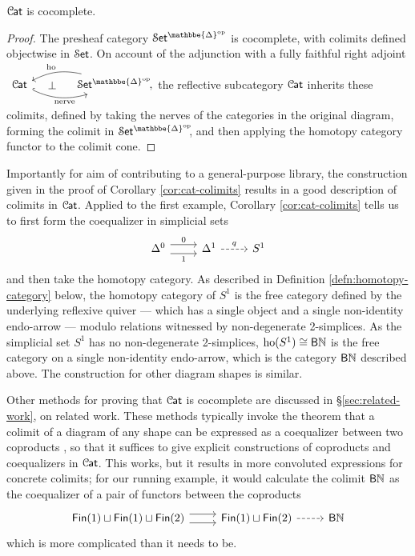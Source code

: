 \documentclass[a4paper,UKenglish,cleveref, autoref, thm-restate]{lipics-v2021}
\newcommand{\op}{\textup{op}}
\newcommand{\ho}{\textup{ho}}
\newcommand{\nerve}{\textup{nerve}}
\newcommand{\cat}[1]{\textup{\textsf{#1}}}%
\newcommand{\NN}{\mathbb{N}}
\newcommand{\1}{\mathbbe{1}}
\newcommand{\2}{\mathbbe{2}}
\newcommand{\3}{\mathbbe{3}}
\newcommand{\DDelta}{\mathbbe{\Delta}}
\newcommand{\Fin}{\cat{Fin}}
\newcommand{\Cat}{\mathcal{C}{\kern-.75pt}\cat{at}}
\newcommand{\Set}{\mathcal{S}\cat{et}}
\newcommand{\cdoc}[2][]{\href{https://leanprover-community.github.io/mathlib4_docs/find/?pattern=CategoryTheory.#1#2\#doc}{\texttt{#2}}}
\begin{document}
\begin{corollary}[\cdoc{Cat.instHasColimits}]\label{cor:cat-colimits} $\Cat$ is cocomplete.
\end{corollary}
\begin{proof}
The presheaf category $\Set^{\DDelta^\op}$ is cocomplete, with colimits defined objectwise in $\Set$. On account of the adjunction with a fully faithful right adjoint
$ \begin{tikzcd}[column sep=large] \Cat \arrow[r, bend right=20, hook, "{\nerve}"' pos=.6] \arrow[r, phantom, "\bot"] & \Set^{\DDelta^\op}\! ,\!\! \arrow[l, bend right=20, "{\ho}"' pos=.45]
\end{tikzcd}$  the reflective subcategory $\Cat$ inherits these colimits, defined by taking the nerves of the categories in the original diagram, forming the colimit in $\Set^{\DDelta^\op}\!\!$, and then applying the homotopy category functor to the colimit cone.
\end{proof}

Importantly for aim of contributing to a general-purpose library, the construction given in the proof of Corollary \ref{cor:cat-colimits} results in a good description of colimits in $\Cat$. Applied to the first example, Corollary \ref{cor:cat-colimits} tells us to first form the coequalizer in simplicial sets
\[ \begin{tikzcd} \Delta^0 \arrow[r, shift left=.4em, "0"] \arrow[r, shift right=.4em, "1"'] & \Delta^1 \arrow[r, dashed, "q"] & S^1 \end{tikzcd}\] and then take the homotopy category. As described in Definition \ref{defn:homotopy-category} below, the homotopy category of $S^1$ is the free category defined by the underlying reflexive quiver --- which has a single object and a single non-identity endo-arrow --- modulo relations witnessed by non-degenerate 2-simplices. As the simplicial set $S^1$ has no non-degenerate 2-simplices, $\ho(S^1) \cong \cat{B}\NN$ is the free category on a single non-identity endo-arrow, which is the category $\cat{B}\NN$ described above. The construction for other diagram shapes is similar.

Other methods for proving that $\Cat$ is cocomplete are discussed in \S\ref{sec:related-work}, on related work. These methods typically invoke the theorem that a colimit of a diagram of any shape can be expressed as a coequalizer between two coproducts \cite[V.2.2]{MacLane:1998cw}, so that it suffices to give explicit constructions of coproducts and coequalizers in $\Cat$. This works, but it results in more convoluted expressions for concrete colimits; for our running example, it would calculate the colimit $\cat{B}\NN$ as the coequalizer of a pair of functors between the coproducts
\[ \begin{tikzcd} \Fin(1) \sqcup \Fin(1) \sqcup \Fin(2) \arrow[r, shift left=.4em] \arrow[r, shift right=.4em] & \Fin(1) \sqcup \Fin(2) \arrow[r, dashed] & \cat{B}\NN \end{tikzcd}\]
which is more complicated than it needs to be.
\end{document}
